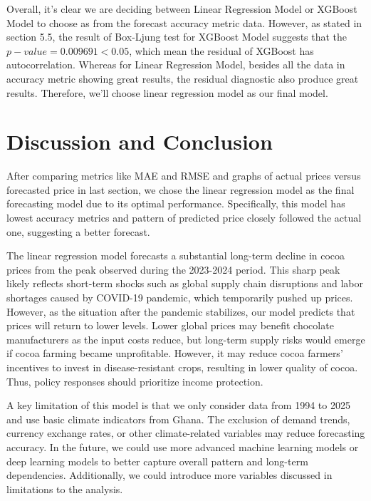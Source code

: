 \documentclass[10pt]{article}
\begin{document}
\noindent
Overall, it's clear we are deciding between Linear Regression Model or XGBoost Model to choose as from the forecast accuracy metric data. However, as stated in section 5.5, the result of Box-Ljung test for XGBoost Model suggests that the $p-value = 0.009691 < 0.05$, which mean the residual of XGBoost has autocorrelation. Whereas for Linear Regression Model, besides all the data in accuracy metric showing great results, the residual diagnostic also produce great results. Therefore, we'll choose linear regression model as our final model. 

\newpage

\section{Discussion and Conclusion}
After comparing metrics like MAE and RMSE and graphs of actual prices versus forecasted price in last section, we chose the linear regression model as the final forecasting model due to its optimal performance. Specifically, this model has lowest accuracy metrics and pattern of predicted price closely followed the actual one, suggesting a better forecast.

\noindent
The linear regression model forecasts a substantial long-term decline in cocoa prices from the peak observed during the 2023-2024 period. This sharp peak likely reflects short-term shocks such as global supply chain disruptions and labor shortages caused by COVID-19 pandemic, which temporarily pushed up prices. However, as the situation after the pandemic stabilizes, our model predicts that prices will return to lower levels. Lower global prices may benefit chocolate manufacturers as the input costs reduce, but long-term supply risks would emerge if cocoa farming became unprofitable. However, it may reduce cocoa farmers’ incentives to invest in disease-resistant crops, resulting in lower quality of cocoa. Thus, policy responses should prioritize income protection.

\noindent
A key limitation of this model is that we only consider data from 1994 to 2025 and use basic climate indicators from Ghana. The exclusion of demand trends, currency exchange rates, or other climate-related variables may reduce forecasting accuracy. In the future, we could use more advanced machine learning models or deep learning models to better capture overall pattern and long-term dependencies. Additionally, we could introduce more variables discussed in limitations to the analysis.
\end{document}
